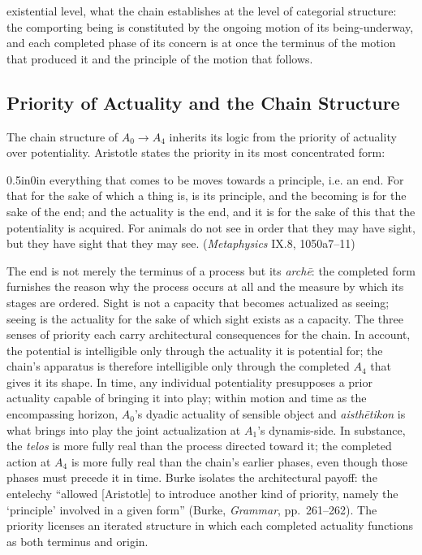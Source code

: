 \documentclass{article}
\begin{document}
existential level, what the chain establishes at the level of categorial structure: the comporting being is constituted by the ongoing motion of its being-underway, and each completed phase of its concern is at once the terminus of the motion that produced it and the principle of the motion that follows.

\subsection{Priority of Actuality and the Chain Structure}

The chain structure of $A_0 \rightarrow A_4$ inherits its logic from the priority of actuality over potentiality. Aristotle states the priority in its most concentrated form:
\begin{adjustwidth}{0.5in}{0in}
everything that comes to be moves towards a principle, i.e. an end. For that for the sake of which a thing is, is its principle, and the becoming is for the sake of the end; and the actuality is the end, and it is for the sake of this that the potentiality is acquired. For animals do not see in order that they may have sight, but they have sight that they may see. (\textit{Metaphysics} IX.8, 1050a7--11)
\end{adjustwidth}
The end is not merely the terminus of a process but its \textit{archē}: the completed form furnishes the reason why the process occurs at all and the measure by which its stages are ordered. Sight is not a capacity that becomes actualized as seeing; seeing is the actuality for the sake of which sight exists as a capacity. The three senses of priority each carry architectural consequences for the chain. In account, the potential is intelligible only through the actuality it is potential for; the chain's apparatus is therefore intelligible only through the completed $A_4$ that gives it its shape. In time, any individual potentiality presupposes a prior actuality capable of bringing it into play; within motion and time as the encompassing horizon, $A_0$'s dyadic actuality of sensible object and \textit{aisthētikon} is what brings into play the joint actualization at $A_1$'s dynamis-side. In substance, the \textit{telos} is more fully real than the process directed toward it; the completed action at $A_4$ is more fully real than the chain's earlier phases, even though those phases must precede it in time. Burke isolates the architectural payoff: the entelechy ``allowed [Aristotle] to introduce another kind of priority, namely the `principle' involved in a given form'' (Burke, \textit{Grammar}, pp.~261--262). The priority licenses an iterated structure in which each completed actuality functions as both terminus and origin.
\end{document}
